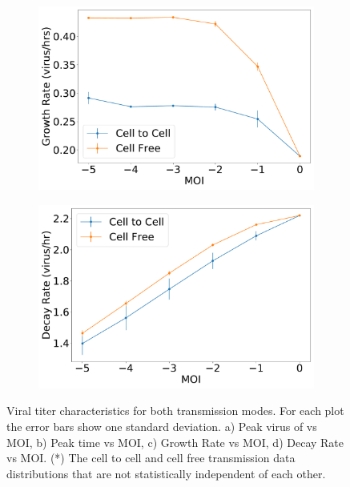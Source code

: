 \documentclass[a4paper]{article}
\begin{document}
\begin{figure}[h]
\begin{subfigure}[b]{0.4\linewidth}
        \caption{}
        \label{fig:Peak_time_of_both_transmission_modes}
    \end{subfigure}
    \begin{subfigure}[b]{0.4\linewidth}
        \includegraphics[width=\linewidth]{Graphs/UpSlopevsMOI.pdf}
        \caption{}
        \label{fig:Growth_Rate_of_both_transmission_modes}
    \end{subfigure}
    \begin{subfigure}[b]{0.4\linewidth}
        \includegraphics[width=\linewidth]{Graphs/DownSlopevsMOI.pdf}
        \caption{}
        \label{fig:Decay_Rate_of_both_transmission_modes}
    \end{subfigure}
    \caption{Viral titer characteristics for both transmission modes. For each plot the error bars show one standard deviation. a) Peak virus of vs MOI, b) Peak time vs MOI, c) Growth Rate vs MOI, d) Decay Rate vs MOI. (*) The cell to cell and cell free transmission data distributions that are not statistically independent of each other.}
    \label{fig:Graphs}
\end{figure}
\end{document}
